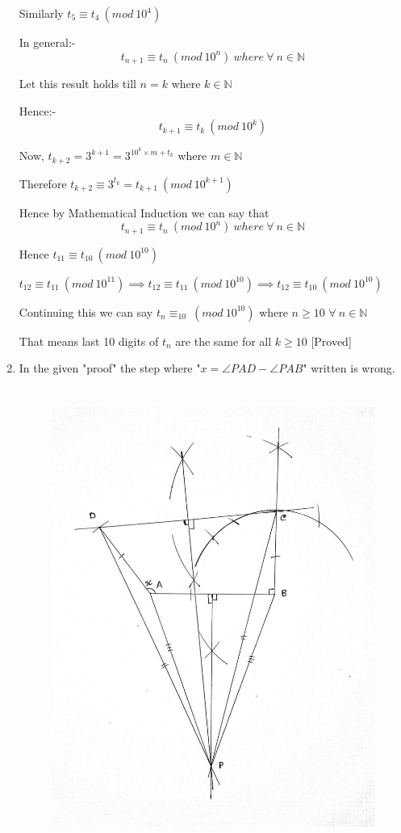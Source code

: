 \documentclass{article}
\begin{document}
\begin{enumerate}
Similarly $t_5\equiv t_4\ (mod \ 10^4)$

In general:- $$t_{n+1}\equiv t_n\  (mod \ 10^n)\  where \ \forall \ n\in \mathbb{N}$$ 

Let this result holds till $n=k$ where $k\in \mathbb{N}$

Hence:-$$t_{k+1}\equiv t_k\ (mod \ 10^k)$$

Now, $t_{k+2}=3^{k+1}=3^{10^k\times m + t_k} $ where $m\in \mathbb{N}$

Therefore $ t_{k+2}\equiv 3^{t_k}= t_{k+1}\ (mod \ 10^{k+1})$

Hence by Mathematical Induction we can say that $$t_{n+1}\equiv t_n\ (mod \ 10^n)\  where \ \forall \ n\in \mathbb{N}$$ 

Hence $t_{11}\equiv t_{10}\  (mod \ 10^{10})$

$t_{12}\equiv t_{11}\ (mod \ 10^{11})\implies t_{12}\equiv t_{11}\  (mod \ 10^{10})\implies t_{12}\equiv t_{10}\  (mod \ 10^{10})$

Continuing this we can say $t_{n}\equiv_{10}\  (mod \ 10^{10})$ where $n\geq 10$ $\forall \ n\in \mathbb{N}$

That means last 10 digits of $t_n$ are the same for all $k \geq 10$ [Proved]
\pagebreak

\item In the given "proof" the step where "$x=\angle PAD-\angle PAB$" written is wrong.
\begin{figure}[h]
  \centering
  \includegraphics[width=12cm, height=15cm]{images/a.jpg}
\end{figure}


\end{enumerate}
\end{document}
